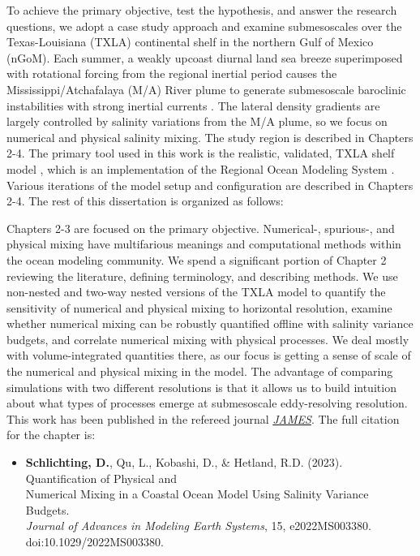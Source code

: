To achieve the primary objective, test the hypothesis, and answer the research questions, we adopt a case study approach and examine submesoscales over the Texas-Louisiana (TXLA) continental shelf in the northern Gulf of Mexico (nGoM). Each summer, a weakly upcoast diurnal land sea breeze superimposed with rotational forcing from the regional inertial period causes the Mississippi/Atchafalaya (M/A) River plume to generate submesoscale baroclinic instabilities with strong inertial currents \citep{Hetland_2017, Kobashi_2020, qu2022rapid}. The lateral density gradients are largely controlled by salinity variations from the M/A plume, so we focus on numerical and physical salinity mixing. The study region is described in Chapters 2-4. The primary tool used in this work is the realistic, validated, TXLA shelf model \citep{Kobashi_2020, Schlichting23, Zhang_2012_forecast}, which is an implementation of the Regional Ocean Modeling System \citep[ROMS, ][]{shchepetkin2005regional}. Various iterations of the model setup and configuration are described in Chapters 2-4. The rest of this dissertation is organized as follows: 

Chapters 2-3 are focused on the primary objective. Numerical-, spurious-, and physical mixing have multifarious meanings and computational methods within the ocean modeling community. We spend a significant portion of Chapter 2 reviewing the literature, defining terminology, and describing methods. We use non-nested and two-way nested versions of the TXLA model to quantify the sensitivity of numerical and physical mixing to horizontal resolution, examine whether numerical mixing can be robustly quantified offline with salinity variance budgets, and correlate numerical mixing with physical processes. We deal mostly with volume-integrated quantities there, as our focus is getting a sense of scale of the numerical and physical mixing in the model. The advantage of comparing simulations with two different resolutions is that it allows us to build intuition about what types of processes emerge at submesoscale eddy-resolving resolution. This work has been published in the refereed journal \href{https://agupubs.onlinelibrary.wiley.com/doi/epdf/10.1029/2022MS003380}{\textit{JAMES}}. The full citation for the chapter is:

\begin{itemize}
    \item[] \textbf{Schlichting, D.}, Qu, L., Kobashi, D., \& Hetland, R.D. (2023). Quantification of Physical and \\
    \hspace{\labelwidth} Numerical Mixing in a Coastal Ocean Model Using Salinity Variance Budgets.\\ 
        \hspace{\labelwidth} \textit{Journal of Advances in Modeling Earth Systems}, 15, e2022MS003380. \\
        \hspace{\labelwidth} doi:10.1029/2022MS003380.
\end{itemize}

